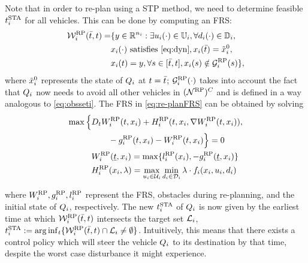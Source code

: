 Note that in order to re-plan using a STP method, we need to determine feasible $t^\text{STA}_i$ for all vehicles. This can be done by computing an FRS:
\begin{equation} \label{eq:re-planFRS}
\begin{aligned} 
\frs_i^{\text{RP}}(\tea, t) = & \{y \in \R^{n_i}: \exists \ctrl_i(\cdot) \in \cfset_i, \forall \dstb_i(\cdot) \in \dfset_i, \\
& \state_i(\cdot) \text{ satisfies \eqref{eq:dyn}}, \state_i(\tea) = \tilde{\state}_i^0, \\
& \state_i(t) = y, \forall s \in [\tea, t], \state_i(s) \notin \obsset_i^{\text{RP}}(s) \},
\end{aligned}
\end{equation}
\noindent where $\tilde{x}_i^0$ represents the state of $Q_i$ at $t = \bar{t}$; $\mathcal{G}_i^{\text{RP}}(\cdot)$ takes into account the fact that $Q_i$ now needs to avoid all other vehicles in $(\mathcal{N}^\text{RP})^C$ and is defined in a way analogous to \eqref{eq:obsseti}. The FRS in \eqref{eq:re-planFRS} can be obtained by solving %
\begin{equation}
\begin{aligned}
\max \Big\{&D_t W_i^{\text{RP}}(t, x_i) + H_i^{\text{RP}}(t, x_i, \nabla W_i^{\text{RP}}(t, x_i)), \\
&\qquad - g_i^{\text{RP}}(t, x_i) - W_i^{\text{RP}}(t, x_i) \Big\} = 0\\
&W_i^{\text{RP}}(\underline{t}, x_i) = \max\{l_i^{\text{RP}}(x_i), -g_i^{\text{RP}}(\underline{t}, x_i)\} \\
&H_i^{\text{RP}}(x_i, \lambda) = \max_{u_i \in \mathcal{U}_i} \min_{d_i \in \mathcal{D}_i} \lambda \cdot f_i (x_i, u_i, d_i)
\end{aligned}
\end{equation} 

\noindent where $W_i^{\text{RP}}, g_i^{\text{RP}}, l_i^{\text{RP}}$ represent the FRS, obstacles during re-planning, and the initial state of $Q_i$, respectively. The new $t^\text{STA}_i$ of $Q_i$ is now given by the earliest time at which $\mathcal{W}_i^{\text{RP}}(\bar{t}, t)$ intersects the target set $\mathcal{L}_i$, $t^\text{STA}_i := \arg \inf_t \{ \mathcal{W}_i^{\text{RP}}(\bar{t}, t) \cap \mathcal{L}_i \neq \emptyset \}$. Intuitively, this means that there exists a control policy which will steer the vehicle $Q_i$ to its destination by that time, despite the worst case disturbance it might experience.

